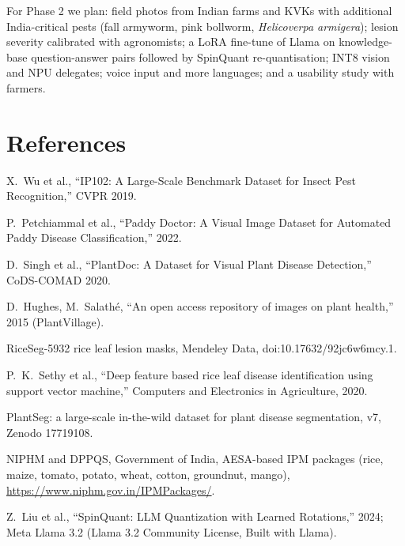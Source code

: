 \documentclass[11pt,a4paper]{article}
\begin{document}
For Phase 2 we plan: field photos from Indian farms and KVKs with additional India-critical pests (fall armyworm, pink
bollworm, \textit{Helicoverpa armigera}); lesion severity calibrated with agronomists; a LoRA fine-tune of Llama on
knowledge-base question-answer pairs followed by SpinQuant re-quantisation; INT8 vision and NPU delegates; voice input
and more languages; and a usability study with farmers.

\section*{References}
\small
\begin{enumerate}[label={[\arabic*]}, leftmargin=2em, itemsep=1pt]
\item X.~Wu et al., ``IP102: A Large-Scale Benchmark Dataset for Insect Pest Recognition,'' CVPR 2019.
\item P.~Petchiammal et al., ``Paddy Doctor: A Visual Image Dataset for Automated Paddy Disease Classification,'' 2022.
\item D.~Singh et al., ``PlantDoc: A Dataset for Visual Plant Disease Detection,'' CoDS-COMAD 2020.
\item D.~Hughes, M.~Salathé, ``An open access repository of images on plant health,'' 2015 (PlantVillage).
\item RiceSeg-5932 rice leaf lesion masks, Mendeley Data, doi:10.17632/92jc6w6mcy.1.
\item P.~K.~Sethy et al., ``Deep feature based rice leaf disease identification using support vector machine,'' Computers and Electronics in Agriculture, 2020.
\item PlantSeg: a large-scale in-the-wild dataset for plant disease segmentation, v7, Zenodo 17719108.
\item NIPHM and DPPQS, Government of India, AESA-based IPM packages (rice, maize, tomato, potato, wheat, cotton, groundnut, mango), \url{https://www.niphm.gov.in/IPMPackages/}.
\item Z.~Liu et al., ``SpinQuant: LLM Quantization with Learned Rotations,'' 2024; Meta Llama 3.2 (Llama 3.2 Community License, Built with Llama).\end{enumerate}
\end{document}

